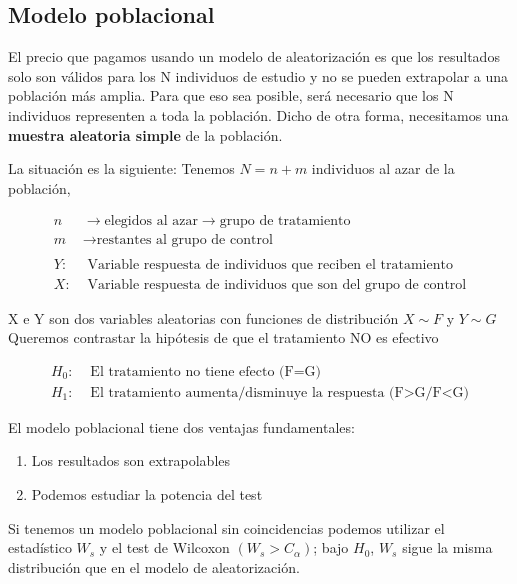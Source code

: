 \subsection{Modelo poblacional}

El precio que pagamos usando un modelo de aleatorización es que los resultados solo son válidos para los N individuos de estudio y no se pueden extrapolar a una población más amplia.
Para que eso sea posible, será necesario que los N individuos representen a toda la población. Dicho de otra forma, necesitamos una \textbf{muestra aleatoria simple} de la población.

La situación es la siguiente:
Tenemos $N=n+m$ individuos al azar de la población,

$$
\begin{aligned}
    n & \longrightarrow \text{elegidos al azar}\longrightarrow \text{grupo de tratamiento} \\
    m & \longrightarrow \text{restantes al grupo de control} \\
    \ & \ \\
    Y: & \text{ Variable respuesta de individuos que reciben el tratamiento}\\
    X: & \text{ Variable respuesta de individuos que son del grupo de control}  
\end{aligned}
$$

X e Y son dos variables aleatorias con funciones de distribución $X\sim F$ y $Y\sim G$ \\
\noindent Queremos contrastar la hipótesis de que el tratamiento NO es efectivo

$$
\begin{aligned}
    H_0: & \text{ El tratamiento no tiene efecto (F=G)} \\
    H_1: & \text{ El tratamiento aumenta/disminuye la respuesta (F>G/F<G)}  
\end{aligned}
$$

El modelo poblacional tiene dos ventajas fundamentales:
\begin{enumerate}
    \item Los resultados son extrapolables
    \item Podemos estudiar la potencia del test
\end{enumerate}

\noindent Si tenemos un modelo poblacional sin coincidencias podemos utilizar el estadístico $W_s$ y el test de Wilcoxon $(W_s>C_\alpha)$; bajo $H_0$, $W_s$ sigue la misma distribución que en el modelo de aleatorización.

